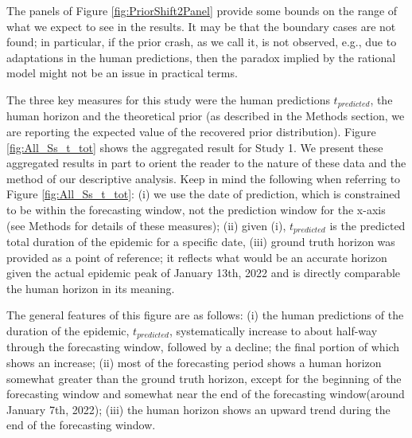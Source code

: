 The panels of Figure \ref{fig:PriorShift2Panel} provide some bounds on the range of what we expect to see in the results. It may be that the boundary cases are not found; in particular, if the prior crash, as we call it, is not observed, e.g., due to adaptations in the human predictions, then the paradox implied by the rational model might not be an issue in practical terms. 

The three key measures for this study were the human predictions $t_{predicted}$, the human horizon and the theoretical prior (as described in the Methods section, we are reporting the expected value of the recovered prior distribution).  Figure \ref{fig:All_Ss_t_tot} shows the aggregated result for Study 1.  We present these aggregated results in part to orient the reader to the nature of these data and the method of our descriptive analysis.  Keep in mind the following when referring to Figure \ref{fig:All_Ss_t_tot}:  (i) we use the date of prediction, which is constrained to be within the forecasting window, not the prediction window for the x-axis (see Methods for details of these measures); (ii) given (i), $t_{predicted}$ is the predicted total duration of the epidemic for a specific date, (iii) ground truth horizon was provided as a point of reference; it reflects what would be an accurate horizon given the actual epidemic peak of January 13th, 2022 and is directly comparable the human horizon in its meaning.  

The general features of this figure are as follows: (i) the human predictions of the duration of the epidemic, $t_{predicted}$, systematically increase to about half-way through the forecasting window, followed by a decline; the final portion of which shows an increase; (ii) most of the forecasting period shows a human horizon somewhat greater than the ground truth horizon, except for the beginning of the forecasting window and somewhat near the end of the forecasting window(around January 7th, 2022); (iii) the human horizon shows an upward trend during the end of the forecasting window.

